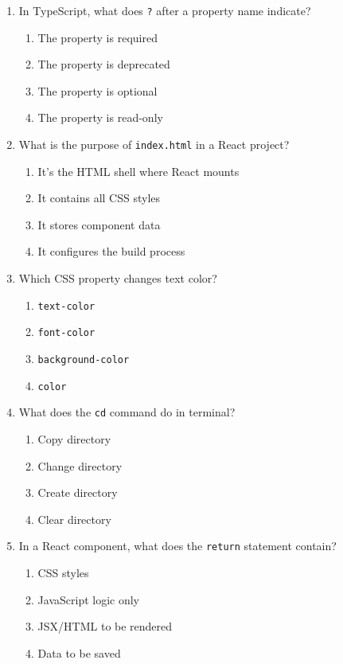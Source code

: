 \documentclass[12pt,a4paper]{article}
\begin{document}
\begin{enumerate}
\item In TypeScript, what does \texttt{?} after a property name indicate?
\begin{enumerate}[label=\Alph*)]
    \item The property is required
    \item The property is deprecated
    \item The property is optional
    \item The property is read-only
\end{enumerate}

\item What is the purpose of \texttt{index.html} in a React project?
\begin{enumerate}[label=\Alph*)]
    \item It's the HTML shell where React mounts
    \item It contains all CSS styles
    \item It stores component data
    \item It configures the build process
\end{enumerate}

\item Which CSS property changes text color?
\begin{enumerate}[label=\Alph*)]
    \item \texttt{text-color}
    \item \texttt{font-color}
    \item \texttt{background-color}
    \item \texttt{color}
\end{enumerate}

\item What does the \texttt{cd} command do in terminal?
\begin{enumerate}[label=\Alph*)]
    \item Copy directory
    \item Change directory
    \item Create directory
    \item Clear directory
\end{enumerate}

\item In a React component, what does the \texttt{return} statement contain?
\begin{enumerate}[label=\Alph*)]
    \item CSS styles
    \item JavaScript logic only
    \item JSX/HTML to be rendered
    \item Data to be saved
\end{enumerate}


\end{enumerate}
\end{document}

